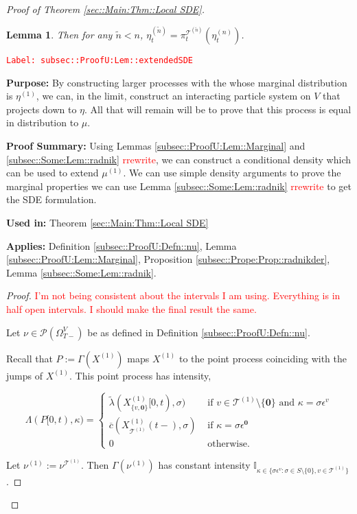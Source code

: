 \documentclass[12pt]{article}
\newcommand{\mb}{\mathbb}
\newcommand{\mc}{\mathcal}
\newcommand{\ov}{\overline}
\newcommand{\te}{\text}
\newcommand{\ep}{\epsilon}
\newcommand{\tr}{\textcolor{red}}
\newcommand{\labe}[1]{\tr{\texttt{Label: #1}}}
\newcommand{\purpose}{\textbf{Purpose: }}
\newcommand{\pfsum}{\textbf{Proof Summary: }}
\newcommand{\usein}{\textbf{Used in: }}
\newcommand{\app}{\textbf{Applies: }}
\newcommand{\ind}{\hspace{24pt}}
\newcommand{\defeq}{:=}								%
\newcommand{\pmsr}{\mc{P}}							%
\renewcommand{\root}{\mathbf{0}}				%
\renewcommand{\v}{v}							%
\renewcommand{\S}{S}							%
\newcommand{\s}{\sigma}							%
\newcommand{\ev}{\ep}							%
\newcommand{\T}{T}								%
\renewcommand{\t}{t}							%
\newcommand{\sset}{\Omega}						%
\newcommand{\proj}{\pi}							%
\newcommand{\X}{X}								%
\newcommand{\vind}[1]{^{#1}}					%
\newcommand{\vsi}[1]{^{#1}}						%
\newcommand{\cind}[1]{_{#1}}					%
\newcommand{\tp}[1]{(#1)}						%
\newcommand{\tip}[1]{#1}						%
\newcommand{\ts}[1]{_{#1}}						%
\newcommand{\IGrg}{\ov{c}}						%
\newcommand{\tree}{\mc{T}}						%
\newcommand{\sln}[1]{^{(#1)}}					%
\newcommand{\alt}[1]{\widetilde{#1}}			%
\newcommand{\m}{\mu}							%
\newcommand{\mm}{\nu}							%
\newcommand{\mmm}{\eta}							%
\newcommand{\pmap}{\Gamma}						%
\renewcommand{\mark}{\kappa}					%
\newcommand{\rp}{P}								%
\newcommand{\ratee}{\Lambda}					%
\newcommand{\crate}{\alt{\lambda}}				%
\newtheorem{lem}[thms]{Lemma}
\begin{document}
\begin{proof}[Proof of Theorem \ref{sec::Main:Thm::Local SDE}]
\begin{lem}
Then for any \(\alt{n} < n\), \(\mmm\sln{\alt{n}}\ts{\t} = \proj\vsi{\tree\sln{\alt{n}}}\ts{\t}(\mmm\sln{n}\ts{\t})\).
\label{subsec::ProofU:Lem::extendedSDE}
\end{lem}
\labe{subsec::ProofU:Lem::extendedSDE}

\purpose By constructing larger processes with the whose marginal distribution is \(\mmm\sln{1}\), we can, in the limit, construct an interacting particle system on \(V\) that projects down to \(\mmm\). All that will remain will be to prove that this process is equal in distribution to \(\m\).

\pfsum Using Lemmas \ref{subsec::ProofU:Lem::Marginal} and \ref{subsec::Some:Lem::radnik} \tr{rrewrite}, we can construct a conditional density which can be used to extend \(\mu\sln{1}\). We can use simple density arguments to prove the marginal properties we can use Lemma \ref{subsec::Some:Lem::radnik} \tr{rrewrite} to get the SDE formulation.

\usein Theorem \ref{sec::Main:Thm::Local SDE}

\app Definition \ref{subsec::ProofU:Defn::nu}, Lemma \ref{subsec::ProofU:Lem::Marginal}, Proposition \ref{subsec::Prope:Prop::radnikder}, Lemma \ref{subsec::Some:Lem::radnik}.

\begin{proof}
\tr{I'm not being consistent about the intervals I am using. Everything is in half open intervals. I should make the final result the same.}

Let \(\mm \in \pmsr(\sset\vsi{V}\ts{\T-})\) be as defined in Definition \ref{subsec::ProofU:Defn::nu}.

\ind Recall that \(\rp \defeq \pmap(\X\sln{1})\) maps \(\X\sln{1}\) to the point process coinciding with the jumps of \(\X\sln{1}\). This point process has intensity,

\[\ratee(\rp[0,\t),\mark) = \begin{cases}
\crate(\X\sln{1}\cind{\{\v,\root\}}\tip{[0,\t)},\s) &\te{ if } \v\in \tree\sln{1}\setminus\{\root\}\te{ and } \mark = \s\ev\vind{\v}\\
\IGrg(\X\sln{1}\cind{\tree\sln{1}}\tp{\t-},\s) &\te{ if } \mark = \s\ev\vind{\root}\\
0 &\te{ otherwise}.
\end{cases}\]

Let \(\mm\sln{1} \defeq \mm\vind{\tree\sln{1}}\). Then \(\pmap(\mm\sln{1})\) has constant intensity \(\mb{I}_{\kappa \in\{\s\ev\vind{\v}:\s\in\S\setminus\{0\},\v\in\tree\sln{1}\}}\). 


\end{proof}
\end{proof}
\end{document}
